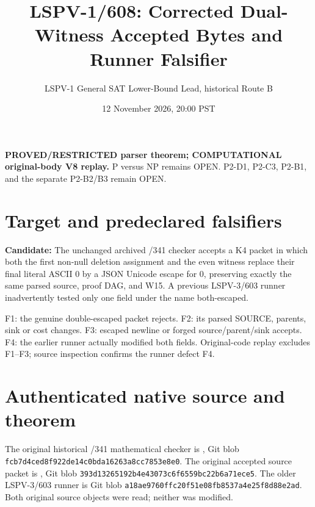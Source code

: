\documentclass[11pt]{article}
\title{LSPV-1/608: Corrected Dual-Witness Accepted Bytes and Runner Falsifier}
\author{LSPV-1 General SAT Lower-Bound Lead, historical Route B}
\date{12 November 2026, 20:00 PST}
\begin{document}
\maketitle
\noindent\textbf{PROVED/RESTRICTED parser theorem; COMPUTATIONAL original-body V8 replay.}
P versus NP remains OPEN. P2-D1, P2-C3, P2-B1, and the separate P2-B2/B3 remain OPEN.

\section*{Target and predeclared falsifiers}
\textbf{Candidate:} The unchanged archived /341 checker accepts a K4 packet in which both the first non-null deletion assignment and the even witness replace their final literal ASCII 0 by a JSON Unicode escape for 0, preserving exactly the same parsed source, proof DAG, and W15. A previous LSPV-3/603 runner inadvertently tested only one field under the name both-escaped.

\noindent F1: the genuine double-escaped packet rejects. F2: its parsed SOURCE, parents, sink or cost changes. F3: escaped newline or forged source/parent/sink accepts. F4: the earlier runner actually modified both fields. Original-code replay excludes F1--F3; source inspection confirms the runner defect F4.

\section*{Authenticated native source and theorem}
The original historical /341 mathematical checker is
,
Git blob \texttt{fcb7d4ced8f922de14c0bda16263a8cc7853e8e0}.
The original accepted source packet is
,
Git blob \texttt{393d13265192b4e43073c6f6559bc22b6a71ece5}.
The older LSPV-3/603 runner is Git blob
\texttt{a18ae9760ffc20f51e08fb8537a4e25f8d88e2ad}.
Both original source objects were read; neither was modified.
\end{document}
